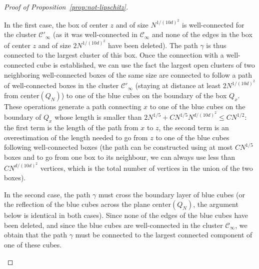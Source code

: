 \documentclass[12pt]{amsart}
\numberwithin{equation}{section}
\begin{document}
\begin{proof}[Proof of Proposition~\ref{prop:not-lipschitz}]
\begin{itemize}
			\smallskip
			
			In the first case, the box of center $z$ and of size $N^{1/(10d)^2}$ is well-connected for the cluster $\mathscr{C}'_{\infty}$ (as it was well-connected in $\mathscr{C}_{\infty}$ and none of the edges in the box of center $z$ and of size $2N^{1/(10d)^2}$ have been deleted). The path $\gamma$ is thus connected to the largest cluster of this box. Once the connection with a well-connected cube is established, we can use the fact the largest open clusters of two neighboring well-connected boxes of the same size are connected to follow a path of well-connected boxes in the cluster $\mathscr{C}'_{\infty}$ (staying at distance at least $2N^{1/(10d)^2}$ from $\mbox{center}(Q_N)$) to one of the blue cubes on the boundary of the box $Q_x$. These operations generate a path connecting $x$ to one of the blue cubes on the boundary of $Q_x$ whose length is smaller than $2 N^{1/5} + C N^{1/5} N^{d/(10d)^2} \leq C N^{1/2}$: the first term is the length of the path from $x$ to $z$, the second term is an overestimation of the length needed to go from $z$ to one of the blue cubes following well-connected boxes (the path can be constructed using at most $C N^{1/5}$ boxes and to go from one box to its neighbour, we can always use less than $CN^{d/(10d)^2}$ vertices, which is the total number of vertices in the union of the two boxes).
			
			In the second case, the path $\gamma$ must cross the boundary layer of blue cubes (or the reflection of the blue cubes across the plane $\mbox{center}(Q_N)$, the argument below is identical in both cases). Since none of the edges of the blue cubes have been deleted, and since the blue cubes are well-connected in the cluster $\mathscr{C}_{\infty}$, we obtain that the path $\gamma$ must be connected to the largest connected component of one of these cubes.
			

\end{itemize}
\end{proof}
\end{document}
